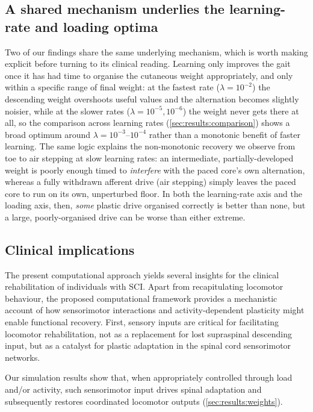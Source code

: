 \subsection{A shared mechanism underlies the learning-rate and loading
optima}
Two of our findings share the same underlying mechanism, which is worth
making explicit before turning to its clinical reading. Learning only
improves the gait once it has had time to organise the cutaneous weight
appropriately, and only within a specific range of final weight: at the
fastest rate ($\lambda=10^{-2}$) the descending weight overshoots useful
values and the alternation becomes slightly noisier, while at the slower
rates ($\lambda=10^{-5}, 10^{-6}$) the weight never gets there at all, so
the comparison across learning rates (\autoref{sec:results:comparison})
shows a broad optimum around $\lambda=10^{-3}$--$10^{-4}$ rather than a
monotonic benefit of faster learning. The same logic explains the
non-monotonic recovery we observe from toe to air stepping at slow learning
rates: an intermediate, partially-developed weight is poorly enough timed
to \emph{interfere} with the paced core's own alternation, whereas a fully
withdrawn afferent drive (air stepping) simply leaves the paced core to run
on its own, unperturbed floor. In both the learning-rate axis and the
loading axis, then, \emph{some} plastic drive organised correctly is better
than none, but a large, poorly-organised drive can be worse than either
extreme.

\subsection{Clinical implications}
The present computational approach yields several insights for the
clinical rehabilitation of individuals with SCI. Apart from recapitulating
locomotor behaviour, the proposed computational framework provides a
mechanistic account of how sensorimotor interactions and activity-dependent
plasticity might enable functional recovery. First, sensory inputs are
critical for facilitating locomotor rehabilitation, not as a replacement
for lost supraspinal descending input, but as a catalyst for plastic
adaptation in the spinal cord sensorimotor networks.

Our simulation results show that, when appropriately controlled through
load and/or activity, such sensorimotor input drives spinal adaptation and
subsequently restores coordinated locomotor outputs
(\autoref{sec:results:weights}).

